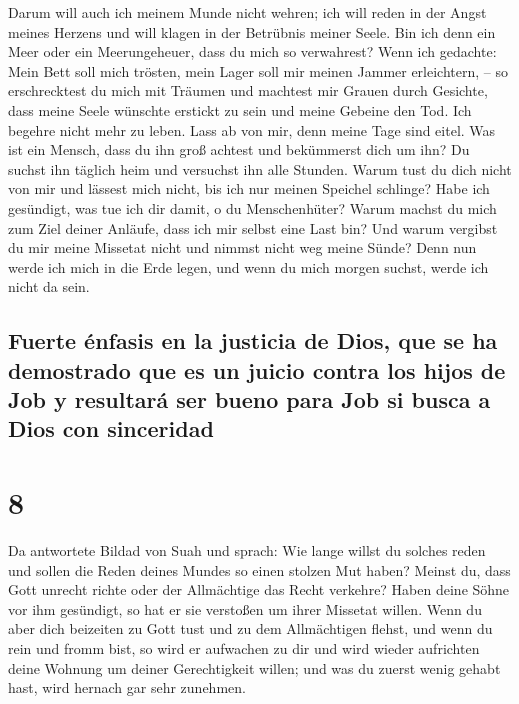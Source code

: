  Darum will auch ich meinem Munde nicht wehren; ich will
reden in der Angst meines Herzens und will klagen in der Betrübnis
meiner Seele.  Bin ich denn ein Meer oder ein
Meerungeheuer, dass du mich so verwahrest?  Wenn ich
gedachte: Mein Bett soll mich trösten, mein Lager soll mir meinen Jammer
erleichtern, --  so erschrecktest du mich mit Träumen und
machtest mir Grauen durch Gesichte,  dass meine Seele
wünschte erstickt zu sein und meine Gebeine den Tod.  Ich
begehre nicht mehr zu leben. Lass ab von mir, denn meine Tage sind
eitel.  Was ist ein Mensch, dass du ihn groß achtest und
bekümmerst dich um ihn?  Du suchst ihn täglich heim und
versuchst ihn alle Stunden.  Warum tust du dich nicht von
mir und lässest mich nicht, bis ich nur meinen Speichel schlinge?
 Habe ich gesündigt, was tue ich dir damit, o du
Menschenhüter? Warum machst du mich zum Ziel deiner Anläufe, dass ich
mir selbst eine Last bin?  Und warum vergibst du mir
meine Missetat nicht und nimmst nicht weg meine Sünde? Denn nun werde
ich mich in die Erde legen, und wenn du mich morgen suchst, werde ich
nicht da sein.

\hypertarget{fuerte-uxe9nfasis-en-la-justicia-de-dios-que-se-ha-demostrado-que-es-un-juicio-contra-los-hijos-de-job-y-resultaruxe1-ser-bueno-para-job-si-busca-a-dios-con-sinceridad}{%
\subsection{Fuerte énfasis en la justicia de Dios, que se ha demostrado
que es un juicio contra los hijos de Job y resultará ser bueno para Job
si busca a Dios con
sinceridad}\label{fuerte-uxe9nfasis-en-la-justicia-de-dios-que-se-ha-demostrado-que-es-un-juicio-contra-los-hijos-de-job-y-resultaruxe1-ser-bueno-para-job-si-busca-a-dios-con-sinceridad}}

\hypertarget{section-7}{%
\section{8}\label{section-7}}

 Da antwortete Bildad von Suah und sprach: 
Wie lange willst du solches reden und sollen die Reden deines Mundes so
einen stolzen Mut haben?  Meinst du, dass Gott unrecht
richte oder der Allmächtige das Recht verkehre?  Haben
deine Söhne vor ihm gesündigt, so hat er sie verstoßen um ihrer Missetat
willen.  Wenn du aber dich beizeiten zu Gott tust und zu
dem Allmächtigen flehst,  und wenn du rein und fromm bist,
so wird er aufwachen zu dir und wird wieder aufrichten deine Wohnung um
deiner Gerechtigkeit willen;  und was du zuerst wenig
gehabt hast, wird hernach gar sehr zunehmen.

